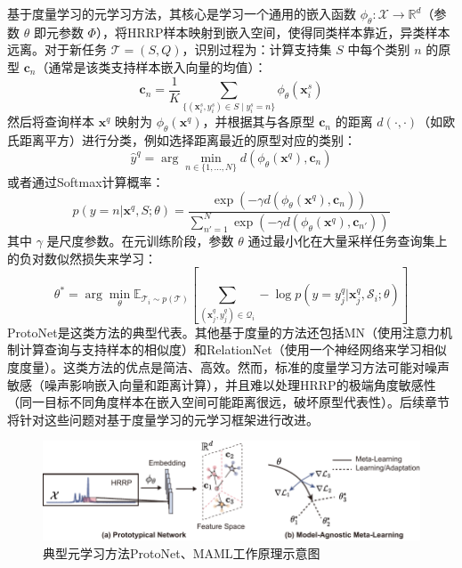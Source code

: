 基于度量学习的元学习方法，其核心是学习一个通用的嵌入函数 $\phi_\theta: \mathcal{X} \rightarrow \mathbb{R}^d$（参数 $\theta$ 即元参数 $\Phi$），将HRRP样本映射到嵌入空间，使得同类样本靠近，异类样本远离。对于新任务 $\mathcal{T}=(S, Q)$，识别过程为：计算支持集 $S$ 中每个类别 $n$ 的原型 $\mathbf{c}_n$（通常是该类支持样本嵌入向量的均值）：
\begin{equation}
    \mathbf{c}_n = \frac{1}{K} \sum_{\{(\mathbf{x}_i^s, y_i^s) \in S \mid y_i^s=n\}} \phi_\theta(\mathbf{x}_i^s)
    \label{eq:prototype_calculation}
\end{equation}
然后将查询样本 $\mathbf{x}^q$ 映射为 $\phi_\theta(\mathbf{x}^q)$，并根据其与各原型 $\mathbf{c}_n$ 的距离 $d(\cdot, \cdot)$（如欧氏距离平方）进行分类，例如选择距离最近的原型对应的类别：
\begin{equation}
    \hat{y}^q = \arg\min_{n \in \{1, \dots, N\}} d(\phi_\theta(\mathbf{x}^q), \mathbf{c}_n)
    \label{eq:protonet_prediction_argmin}
\end{equation}
或者通过Softmax计算概率：
\begin{equation}
    p(y=n | \mathbf{x}^q, S; \theta) = \frac{\exp(-\gamma d(\phi_\theta(\mathbf{x}^q), \mathbf{c}_n))}{\sum_{n'=1}^{N} \exp(-\gamma d(\phi_\theta(\mathbf{x}^q), \mathbf{c}_{n'}))}
    \label{eq:protonet_prediction_softmax_gamma} %
\end{equation}
其中 $\gamma$ 是尺度参数。在元训练阶段，参数 $\theta$ 通过最小化在大量采样任务查询集上的负对数似然损失来学习：
\begin{equation}
    \theta^* = \arg\min_{\theta} \mathbb{E}_{\mathcal{T}_i \sim p(\mathcal{T})} \left[ \sum_{(\mathbf{x}_j^q, y_j^q) \in \mathcal{Q}_i} -\log p(y=y_j^q | \mathbf{x}_j^q, \mathcal{S}_i; \theta) \right]
    \label{eq:protonet_meta_objective}
\end{equation}
ProtoNet是这类方法的典型代表。其他基于度量的方法还包括MN（使用注意力机制计算查询与支持样本的相似度）和RelationNet（使用一个神经网络来学习相似度度量）。这类方法的优点是简洁、高效。然而，标准的度量学习方法可能对噪声敏感（噪声影响嵌入向量和距离计算），并且难以处理HRRP的极端角度敏感性（同一目标不同角度样本在嵌入空间可能距离很远，破坏原型代表性）。后续章节将针对这些问题对基于度量学习的元学习框架进行改进。

\begin{figure}[h]
    \centering
    \includegraphics[width=\linewidth]{figures/proto_maml.pdf}
    \caption{典型元学习方法ProtoNet、MAML工作原理示意图}
    \label{fig:protonet}
\end{figure}

